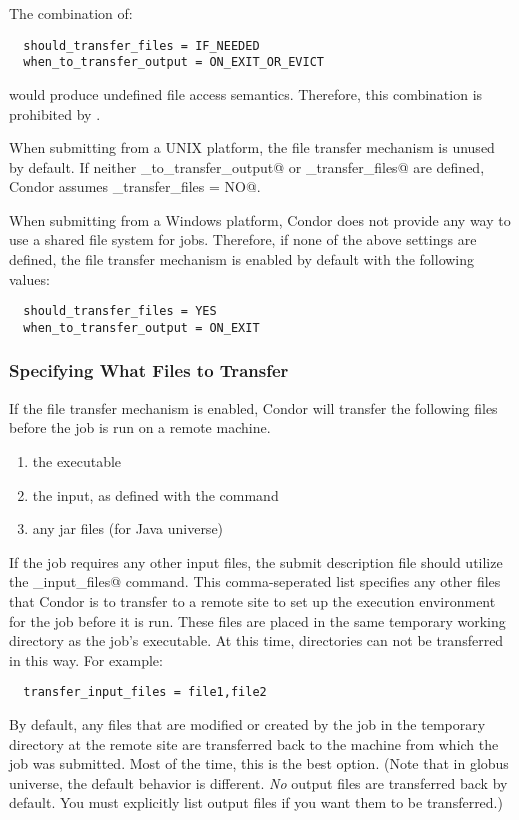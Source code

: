 \Note The combination of:
\begin{verbatim}
  should_transfer_files = IF_NEEDED
  when_to_transfer_output = ON_EXIT_OR_EVICT
\end{verbatim}
would produce undefined file access semantics.
Therefore, this combination is prohibited by .

When submitting from a UNIX platform,
the file transfer mechanism is unused by default.
If neither
\verb@when_to_transfer_output@ or \verb@should_transfer_files@ 
are defined, Condor assumes
\verb@should_transfer_files = NO@.

When submitting from a Windows platform,
Condor does not provide any way to use a shared file
system for jobs. 
Therefore, if none of the above settings are defined, the file
transfer mechanism is enabled by default with the following values:

\begin{verbatim}
  should_transfer_files = YES
  when_to_transfer_output = ON_EXIT
\end{verbatim}

\subsubsection{Specifying What Files to Transfer}

If the file transfer mechanism is enabled,
Condor will transfer the following files before the job
is run on a remote machine.
\begin{enumerate}
  \item the executable
  \item the input, as defined with the \verb@input@ command
  \item any jar files (for Java universe)
\end{enumerate}
If the job requires any other input files,
the submit description file should utilize the
\verb@transfer_input_files@ command.
This comma-seperated list specifies any other files that Condor is to
transfer to a remote site to set up the execution environment for the
job before it is run.
These files are placed in the same temporary working directory
as the job's executable.
At this time, directories can not be transferred in this way.
For example:

\begin{verbatim}
  transfer_input_files = file1,file2 
\end{verbatim}

By default, any files that are modified or created by the job in the
temporary directory at the remote site are transferred back
to the machine from which the job was submitted.
Most of the time, this is the best option.
(Note that in globus universe, the default behavior is different.
\emph{No} output files are transferred back by default.  You must
explicitly list output files if you want them to be transferred.)


